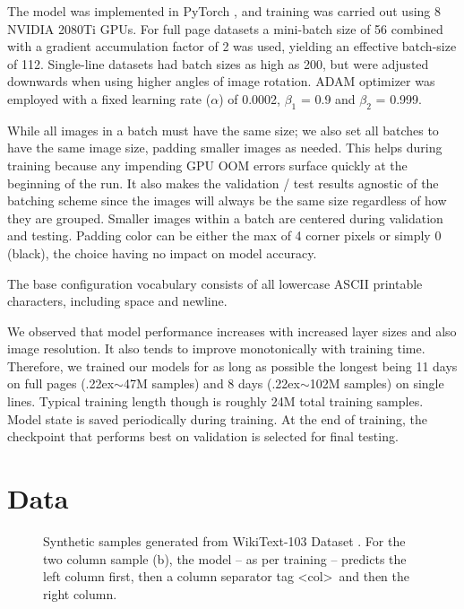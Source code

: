 \documentclass[runningheads]{llncs}
\newcommand{\tilda}{\raise.22ex\hbox{$\scriptstyle\sim$}}
\begin{document}
The model was implemented in PyTorch \cite{NEURIPS2019_9015}, and training was carried out using 8 {\small NVIDIA} 2080Ti GPUs.
For full page datasets a mini-batch size of 56 combined with a gradient accumulation factor of 2 was used, yielding an effective batch-size of 112.
Single-line datasets had batch sizes as high as 200, but were adjusted downwards when using higher angles of image rotation.
{\small ADAM} optimizer \citep{kingma2017adam} was employed with a fixed learning rate ($\alpha$) of 0.0002, $\beta_{1}$ = 0.9 and $\beta_{2}$ = 0.999.

While all images in a batch must have the same size; we also set all batches to have the same image size, padding smaller images as needed.
This helps during training because any impending {\small GPU OOM} errors surface quickly at the beginning of the run.
It also makes the validation / test results agnostic of the batching scheme since the images will always be the same size regardless of how they are grouped.
Smaller images within a batch are centered during validation and testing.
Padding color can be either the max of 4 corner pixels or simply 0 (black), the choice having no impact on model accuracy.


The base configuration vocabulary consists of all lowercase ASCII printable characters, including space and newline.


We observed that model performance increases with increased layer sizes and also image resolution.
It also tends to improve monotonically with training time.
Therefore, we trained our models for as long as possible the longest being 11 days on full pages (\tilda47M samples) and 8 days (\tilda102M samples) on single lines.
Typical training length though is roughly 24M total training samples.
Model state is saved periodically during training.
At the end of training, the checkpoint that performs best on validation is selected for final testing.

\section{Data}\label{sec-data}
\begin{figure}
     \centering
    \hfill
    \caption{\small Synthetic samples generated from WikiText-103 Dataset \citep{DBLP:journals/corr/MerityXBS16}. For the two column sample (b), the model -- as per training -- predicts the left column first, then a column separator tag \textless col\textgreater \, and then the right column.}
    \label{fig-synth}
\end{figure}
\end{document}
